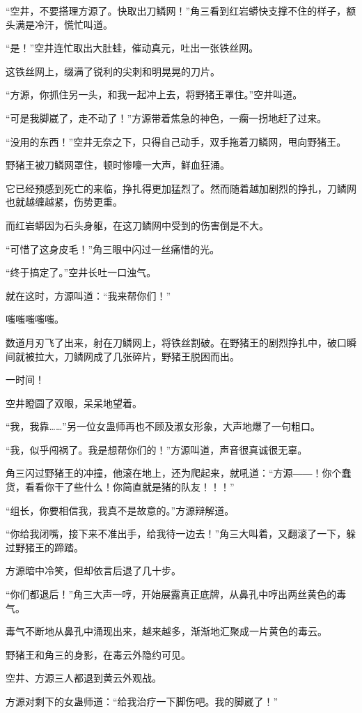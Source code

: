 \begin{this_body}
“空井，不要搭理方源了。快取出刀鳞网！”角三看到红岩蟒快支撑不住的样子，额头满是冷汗，慌忙叫道。

“是！”空井连忙取出大肚蛙，催动真元，吐出一张铁丝网。

这铁丝网上，缀满了锐利的尖刺和明晃晃的刀片。

“方源，你抓住另一头，和我一起冲上去，将野猪王罩住。”空井叫道。

“可是我脚崴了，走不动了！”方源带着焦急的神色，一瘸一拐地赶了过来。

“没用的东西！”空井无奈之下，只得自己动手，双手拖着刀鳞网，甩向野猪王。

野猪王被刀鳞网罩住，顿时惨嚎一大声，鲜血狂涌。

它已经预感到死亡的来临，挣扎得更加猛烈了。然而随着越加剧烈的挣扎，刀鳞网也就越缠越紧，伤势更重。

而红岩蟒因为石头身躯，在这刀鳞网中受到的伤害倒是不大。

“可惜了这身皮毛！”角三眼中闪过一丝痛惜的光。

“终于搞定了。”空井长吐一口浊气。

就在这时，方源叫道：“我来帮你们！”

嗤嗤嗤嗤嗤。

数道月刃飞了出来，射在刀鳞网上，将铁丝割破。在野猪王的剧烈挣扎中，破口瞬间就被拉大，刀鳞网成了几张碎片，野猪王脱困而出。

一时间！

空井瞪圆了双眼，呆呆地望着。

“我，我靠……”另一位女蛊师再也不顾及淑女形象，大声地爆了一句粗口。

“我，似乎闯祸了。我是想帮你们的！”方源叫道，声音很真诚很无辜。

角三闪过野猪王的冲撞，他滚在地上，还为爬起来，就吼道：“方源――！你个蠢货，看看你干了些什么！你简直就是猪的队友！！！”

“组长，你要相信我，我真不是故意的。”方源辩解道。

“你给我闭嘴，接下来不准出手，给我待一边去！”角三大叫着，又翻滚了一下，躲过野猪王的蹄踏。

方源暗中冷笑，但却依言后退了几十步。

“你们都退后！”角三大声一哼，开始展露真正底牌，从鼻孔中哼出两丝黄色的毒气。

毒气不断地从鼻孔中涌现出来，越来越多，渐渐地汇聚成一片黄色的毒云。

野猪王和角三的身影，在毒云外隐约可见。

空井、方源三人都退到黄云外观战。

方源对剩下的女蛊师道：“给我治疗一下脚伤吧。我的脚崴了！”


\end{this_body}
